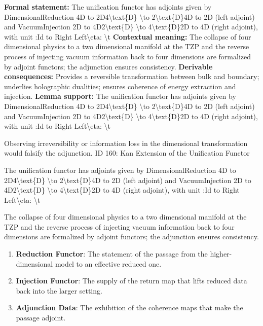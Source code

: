 \begingroup\footnotesize\setlength{\emergencystretch}{3em}\sloppy
\textbf{Formal statement:} The unification functor has adjoints given by DimensionalReduction 4D to 2D4\textbackslash{}text\{D\} \textbackslash{}to 2\textbackslash{}text\{D\}4D to 2D (left adjoint) and VacuumInjection 2D to 4D2\textbackslash{}text\{D\} \textbackslash{}to 4\textbackslash{}text\{D\}2D to 4D (right adjoint), with unit  :Id to Right Left\textbackslash{}eta: \textbackslash{}t
\textbf{Contextual meaning:} The collapse of four dimensional physics to a two dimensional manifold at the TZP and the reverse process of injecting vacuum information back to four dimensions are formalized by adjoint functors; the adjunction ensures consistency.  
\textbf{Derivable consequences:} Provides a reversible transformation between bulk and boundary; underlies holographic dualities; ensures coherence of energy extraction and injection.  
\textbf{Lemma support:} The unification functor has adjoints given by DimensionalReduction 4D to 2D4\textbackslash{}text\{D\} \textbackslash{}to 2\textbackslash{}text\{D\}4D to 2D (left adjoint) and VacuumInjection 2D to 4D2\textbackslash{}text\{D\} \textbackslash{}to 4\textbackslash{}text\{D\}2D to 4D (right adjoint), with unit  :Id to Right Left\textbackslash{}eta: \textbackslash{}t\par
\endgroup

Observing irreversibility or information loss in the dimensional transformation would falsify the adjunction. ID 160: Kan Extension of the Unification Functor  

The unification functor has adjoints given by DimensionalReduction 4D to 2D4\textbackslash{}text\{D\} \textbackslash{}to 2\textbackslash{}text\{D\}4D to 2D (left adjoint) and VacuumInjection 2D to 4D2\textbackslash{}text\{D\} \textbackslash{}to 4\textbackslash{}text\{D\}2D to 4D (right adjoint), with unit  :Id to Right Left\textbackslash{}eta: \textbackslash{}t

The collapse of four dimensional physics to a two dimensional manifold at the TZP and the reverse process of injecting vacuum information back to four dimensions are formalized by adjoint functors; the adjunction ensures consistency.  
\endgroup

\begin{enumerate}[leftmargin=1.6em,itemsep=6pt,topsep=4pt]
\item \textbf{Reduction Functor}: The statement of the passage from the higher-dimensional model to an effective reduced one.
\item \textbf{Injection Functor}: The supply of the return map that lifts reduced data back into the larger setting.
\item \textbf{Adjunction Data}: The exhibition of the coherence maps that make the passage adjoint.
\end{enumerate}


